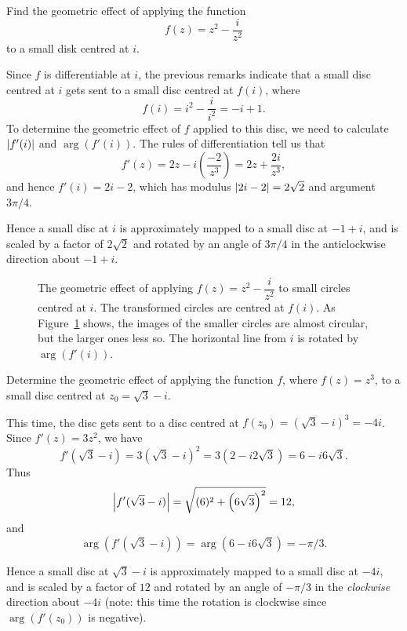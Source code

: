 \begin{example}
Find the geometric effect of applying the function
\[
f(z)=z^2-\frac{i}{z^2}
\]
to a small disk centred at $i$.
\end{example}
\begin{solution}
Since $f$ is differentiable at $i$, the previous remarks indicate that a small disc centred at $i$ gets sent to a small disc centred at $f(i)$, where
\[
f(i) = i^2-\frac{i}{i^2} = -i+1.
\]
To determine the geometric effect of $f$ applied to this disc, we need to calculate $\left| f'(i) \right|$ and $\arg (f'(i))$.  The rules of differentiation tell us that
\[
f'(z) = 2z-i \left( \frac{-2}{z^3} \right) = 2z+ \frac{2i}{z^3},
\]
and hence $f'(i) = 2i-2$, which has modulus $\left| 2i-2 \right|=2\sqrt{2}$ and argument $3\pi/4$.

Hence a small disc at $i$ is approximately mapped to a small disc at $-1+i$, and is scaled by a factor of $2\sqrt{2}$ and rotated by an angle of $3\pi/4$  in the anticlockwise direction about $-1+i$.

\end{solution}

\begin{figure}[H]
\centering
{} \quad {}
\caption{The geometric effect of applying $f(z)=z^2-\dfrac{i}{z^2}$ to small circles centred at $i$. The transformed circles are centred at $f(i)$.  As Figure~\ref{f:circles} shows, the images of the smaller circles are almost circular, but the larger ones less so.  The horizontal line from $i$ is rotated by $\arg(f'(i))$.}
\label{f:circles}
\end{figure}

\begin{example}
Determine the geometric effect of applying the function $f$, where $f(z)=z^3$, to a small disc centred at $z_0 = \sqrt{3}-i$.
\end{example}
\begin{solution}
This time, the disc gets sent to a disc centred at $f(z_0) = (\sqrt{3}-i)^3 = -4i$.  Since $f'(z)=3z^2$, we have
\[
f'(\sqrt{3}-i) = 3 ( \sqrt{3}-i)^2 = 3 (2-i2\sqrt{3}) = 6-i6\sqrt{3}.
\]
Thus
\[
\left| f'(\sqrt{3}-i)  \right| = \sqrt{(6)^2+\left(6\sqrt{3}\right)^2 } = 12,
\]
and
\[
\arg \left( f' (\sqrt{3}-i ) \right) = \arg \left( 6-i6\sqrt{3} \right) = - \pi/3.
\]

Hence a small disc at $\sqrt{3}-i$ is approximately mapped to a small disc at $-4i$, and is scaled by a factor of $12$ and rotated by an angle of $-\pi/3$  in the \emph{clockwise} direction about $-4i$ (note: this time the rotation is clockwise since $\arg (f'(z_0))$ is negative).
\end{solution}




